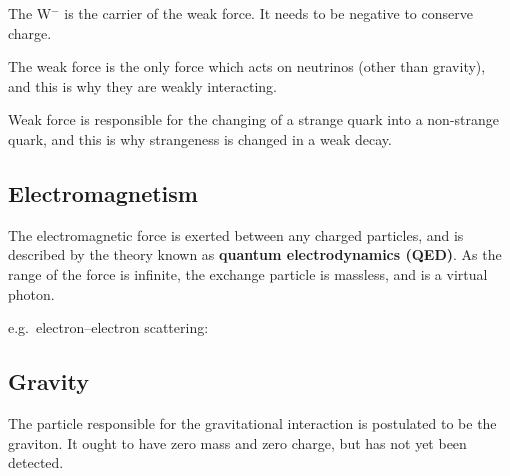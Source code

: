 \documentclass[a4paper,12pt]{article}
\begin{document}
\noindent \begin{minipage}{0.5\textwidth}
\end{minipage}
\begin{minipage}{0.5\textwidth}
The W$^{-}$ is the carrier of the weak force.  It needs to be negative to conserve charge.
\end{minipage}

The weak force is the only force which acts on neutrinos (other than gravity), and this is why they are weakly interacting.

Weak force is responsible for the changing of a strange quark into a non-strange quark, and this is why strangeness is changed in a weak decay.

\subsection{Electromagnetism}

The electromagnetic force is exerted between any charged particles, and is described by the theory known as {\bf quantum electrodynamics (QED)}.  As the range of the force is infinite, the exchange particle is massless, and is a virtual photon.

e.g.\ electron--electron scattering:


\subsection{Gravity}
The particle responsible for the gravitational interaction is postulated to be the graviton.  It ought to have zero mass and zero charge, but has not yet been detected.
\end{document}
